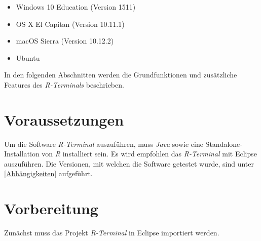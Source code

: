 \documentclass[a4paper, 12pt]{report} %
\begin{document}
\begin{itemize}
\item Windows 10 Education (Version 1511)
\item OS X El Capitan (Version 10.11.1)
\item macOS Sierra (Version 10.12.2)
\item Ubuntu
\end{itemize}


In den folgenden Abschnitten werden die Grundfunktionen und zusätzliche Features des \textit{R-Terminals} beschrieben. 

\section{Voraussetzungen}

Um die Software \textit{R-Terminal} auszuführen, muss \textit{Java} sowie eine Standalone-Installation von \textit{R} installiert sein. Es wird empfohlen das \textit{R-Terminal} mit Eclipse auszuführen.
Die Versionen, mit welchen die Software getestet wurde, sind unter \ref{Abhängigkeiten} aufgeführt. 

\section{Vorbereitung} \label{swtanwender}

Zunächst muss  das Projekt \textit{R-Terminal} in Eclipse importiert werden.
\end{document}
